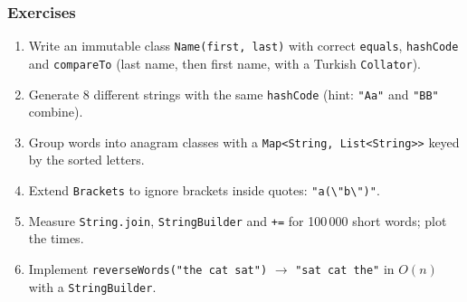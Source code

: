 \documentclass[aspectratio=169,10pt,compress]{beamer}
\begin{document}
\begin{frame}[t,fragile] \frametitle{Exercises}
  \begin{enumerate}\small
    \item Write an immutable class \texttt{Name(first, last)} with correct \texttt{equals}, \texttt{hashCode} and \texttt{compareTo}
          (last name, then first name, with a Turkish \texttt{Collator}).
    \item Generate 8 different strings with the same \texttt{hashCode} (hint: \texttt{"Aa"} and \texttt{"BB"} combine).
    \item Group words into anagram classes with a \texttt{Map<String, List<String>>} keyed by the sorted letters.
    \item Extend \texttt{Brackets} to ignore brackets inside quotes: \texttt{"a(\textbackslash"b\textbackslash")"}.
    \item Measure \texttt{String.join}, \texttt{StringBuilder} and \texttt{+=} for 100\,000 short words; plot the times.
    \item Implement \texttt{reverseWords("the cat sat")} $\to$ \texttt{"sat cat the"} in $O(n)$ with a \texttt{StringBuilder}.
  \end{enumerate}
\end{frame}




\begin{frame}[t,fragile]
	\begin{center}
		\vspace{4cm}
	\end{center}
\end{frame}
\end{document}
